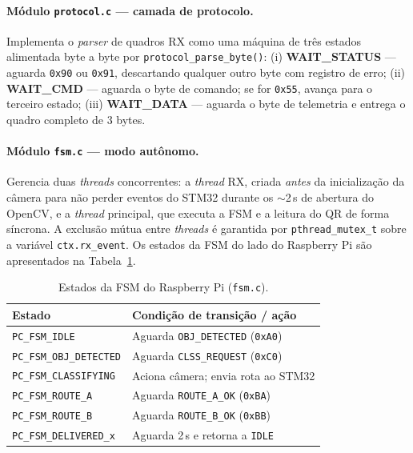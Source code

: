 \paragraph{Módulo \texttt{protocol.c} — camada de protocolo.}
Implementa o \textit{parser} de quadros RX como uma máquina de três estados
alimentada byte a byte por \texttt{protocol\_parse\_byte()}: (i)
\textbf{WAIT\_STATUS} — aguarda \texttt{0x90} ou \texttt{0x91}, descartando
qualquer outro byte com registro de erro; (ii) \textbf{WAIT\_CMD} — aguarda
o byte de comando; se for \texttt{0x55}, avança para o terceiro estado;
(iii) \textbf{WAIT\_DATA} — aguarda o byte de telemetria e entrega o
quadro completo de 3 bytes.

\paragraph{Módulo \texttt{fsm.c} — modo autônomo.}
Gerencia duas \textit{threads} concorrentes: a \textit{thread} RX, criada
\textit{antes} da inicialização da câmera para não perder eventos do STM32
durante os $\sim$2\,s de abertura do OpenCV, e a \textit{thread} principal,
que executa a FSM e a leitura do QR de forma síncrona. A exclusão mútua
entre \textit{threads} é garantida por \texttt{pthread\_mutex\_t} sobre a
variável \texttt{ctx.rx\_event}. Os estados da FSM do lado do Raspberry Pi
são apresentados na Tabela~\ref{tab:fsm_pc_states}.

\begin{table}[!htpb]
\renewcommand{\arraystretch}{1.1}
\caption{Estados da FSM do Raspberry Pi (\texttt{fsm.c}).}
\label{tab:fsm_pc_states}
\centering
\footnotesize
\begin{tabular}{p{2.8cm}p{4.6cm}}
\hline
\textbf{Estado} & \textbf{Condição de transição / ação} \\
\hline
\texttt{PC\_FSM\_IDLE}          & Aguarda \texttt{OBJ\_DETECTED} (\texttt{0xA0}) \\
\texttt{PC\_FSM\_OBJ\_DETECTED} & Aguarda \texttt{CLSS\_REQUEST} (\texttt{0xC0}) \\
\texttt{PC\_FSM\_CLASSIFYING}   & Aciona câmera; envia rota ao STM32 \\
\texttt{PC\_FSM\_ROUTE\_A}      & Aguarda \texttt{ROUTE\_A\_OK} (\texttt{0xBA}) \\
\texttt{PC\_FSM\_ROUTE\_B}      & Aguarda \texttt{ROUTE\_B\_OK} (\texttt{0xBB}) \\
\texttt{PC\_FSM\_DELIVERED\_x}  & Aguarda 2\,s e retorna a \texttt{IDLE} \\
\hline
\end{tabular}
\end{table}

